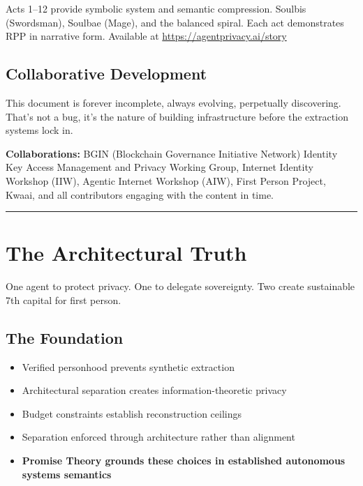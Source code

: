\documentclass[
]{article}
\begin{document}
Acts 1--12 provide symbolic system and semantic compression. Soulbis
(Swordsman), Soulbae (Mage), and the balanced spiral. Each act
demonstrates RPP in narrative form. Available at
\url{https://agentprivacy.ai/story}

\subsection{Collaborative Development}\label{collaborative-development}

This document is forever incomplete, always evolving, perpetually
discovering. That's not a bug, it's the nature of building
infrastructure before the extraction systems lock in.

\textbf{Collaborations:} BGIN (Blockchain Governance Initiative Network)
Identity Key Access Management and Privacy Working Group, Internet
Identity Workshop (IIW), Agentic Internet Workshop (AIW), First Person
Project, Kwaai, and all contributors engaging with the content in time.

\begin{center}\rule{0.5\linewidth}{0.5pt}\end{center}

\section{The Architectural Truth}\label{the-architectural-truth}

One agent to protect privacy. One to delegate sovereignty. Two create
sustainable 7th capital for first person.

\subsection{The Foundation}\label{the-foundation}

\begin{itemize}
\item
  Verified personhood prevents synthetic extraction
\item
  Architectural separation creates information-theoretic privacy
\item
  Budget constraints establish reconstruction ceilings
\item
  Separation enforced through architecture rather than alignment
\item
  \textbf{Promise Theory grounds these choices in established autonomous
  systems semantics}
\end{itemize}
\end{document}
